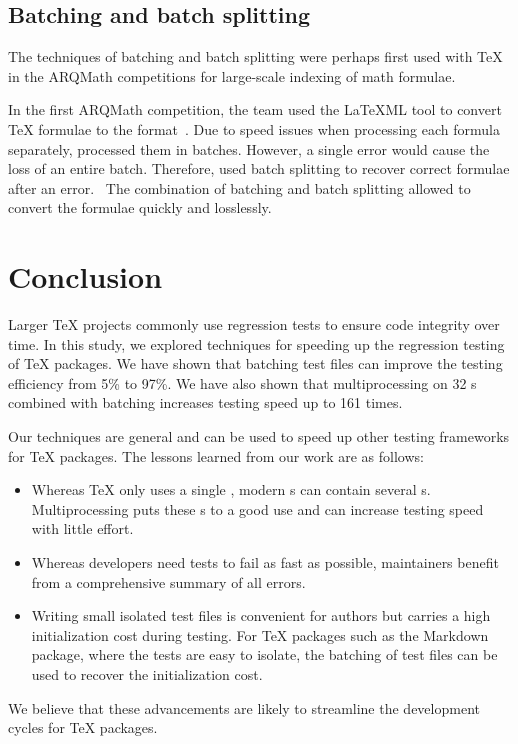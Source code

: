 \documentclass[final]{ltugboat}
\begin{document}
\subsection{Batching and batch splitting}
The techniques of batching and batch splitting were perhaps first used with \TeX{} in the ARQMath competitions for large-scale indexing of math formulae.

In the first ARQMath competition, the  team used the \LaTeX ML tool to convert \TeX{} formulae to the  format~\cite[Section~2.2]{novotny2020three}. Due to speed issues when processing each formula separately,  processed them in batches. However, a single error would cause the loss of an entire batch. Therefore,  used batch splitting to recover correct formulae after an error.~\cite{novotny2020arqmath} The combination of batching and batch splitting allowed  to convert the formulae quickly and losslessly.

\section{Conclusion}
\label{sec:conclusion}

Larger \TeX{} projects commonly use regression tests to ensure code integrity over time.
In this study, we explored techniques for speeding up the regression testing of \TeX{} packages. We have shown that batching test files can improve the testing efficiency from 5\% to 97\%. We have also shown that multiprocessing on 32 s combined with batching increases testing speed up to 161 times.

Our techniques are general and can be used to speed up other testing frameworks for \TeX{} packages. The lessons learned from our work are as follows:
\begin{itemize}
\item Whereas \TeX{} only uses a single , modern s can contain several s. Multiprocessing puts these s to a good use and can increase testing speed with little effort.
\item Whereas developers need tests to fail as fast as possible, maintainers benefit from a comprehensive summary of all errors.
\item Writing small isolated test files is convenient for authors but carries a high initialization cost during testing. For \TeX{} packages such as the Markdown package, where the tests are easy to isolate, the batching of test files can be used to recover the initialization cost.
\end{itemize}
We believe that these advancements are likely to streamline the development cycles for \TeX{} packages.
\end{document}

